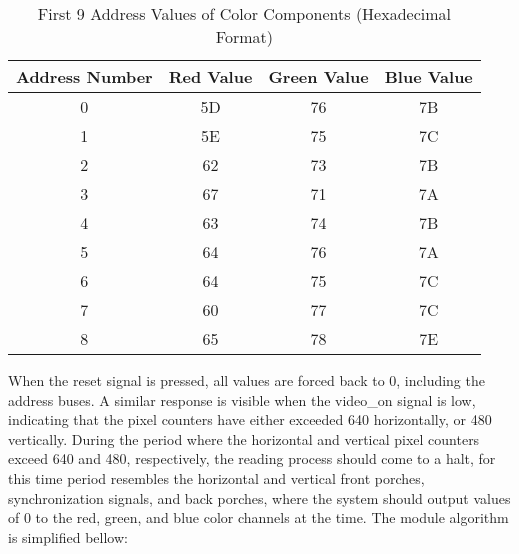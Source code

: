 \begin{table}[H]
    \centering
    \begin{tabular}{|c|c|c|c|} \hline 
         Address Number&  Red Value&  Green Value& Blue Value\\ \hline 
         0&  5D&  76& 7B\\ \hline 
         1&  5E&  75& 7C\\ \hline 
         2&  62&  73& 7B\\ \hline 
         3&  67&  71& 7A\\ \hline 
         4&  63&  74& 7B\\ \hline 
         5&  64&  76& 7A\\ \hline 
         6&  64&  75& 7C\\ \hline 
         7&  60&  77& 7C\\ \hline 
         8&  65&  78& 7E\\ \hline
    \end{tabular}
    \caption{First 9 Address Values of Color Components (Hexadecimal Format)}
    \label{tab:tablepixelvalues}
\end{table}

\par When the reset signal is pressed, all values are forced back to 0, including the address buses. A similar response is visible when the video\_on signal is low, indicating that the pixel counters have either exceeded 640 horizontally, or 480 vertically. During the period where the horizontal and vertical pixel counters exceed 640 and 480, respectively, the reading process should come to a halt, for this time period resembles the horizontal and vertical front porches, synchronization signals, and back porches, where the system should output values of 0 to the red, green, and blue color channels at the time. The module algorithm is simplified bellow:  \newline 

